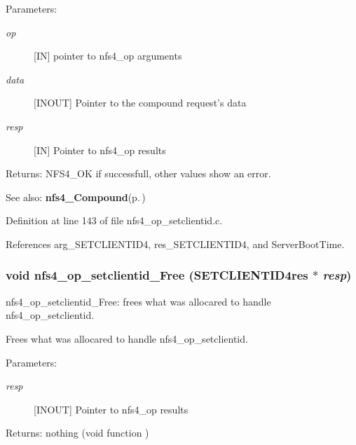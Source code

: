 \begin{Desc}
\item[Parameters:]
\begin{description}
\item[{\em op}][IN] pointer to nfs4\_\-op arguments \item[{\em data}][INOUT] Pointer to the compound request's data \item[{\em resp}][IN] Pointer to nfs4\_\-op results\end{description}
\end{Desc}
\begin{Desc}
\item[Returns:]NFS4\_\-OK if successfull, other values show an error.\end{Desc}
\begin{Desc}
\item[See also:]{\bf nfs4\_\-Compound}{\rm (p.\,\pageref{nfs4__Compound_8c_a4})} \end{Desc}


Definition at line 143 of file nfs4\_\-op\_\-setclientid.c.

References arg\_\-SETCLIENTID4, res\_\-SETCLIENTID4, and Server\-Boot\-Time.
\subsubsection{\setlength{\rightskip}{0pt plus 5cm}void nfs4\_\-op\_\-setclientid\_\-Free (SETCLIENTID4res $\ast$ {\em resp})}\label{nfs4__op__setclientid_8c_a4}


nfs4\_\-op\_\-setclientid\_\-Free: frees what was allocared to handle nfs4\_\-op\_\-setclientid.

Frees what was allocared to handle nfs4\_\-op\_\-setclientid.

\begin{Desc}
\item[Parameters:]
\begin{description}
\item[{\em resp}][INOUT] Pointer to nfs4\_\-op results\end{description}
\end{Desc}
\begin{Desc}
\item[Returns:]nothing (void function ) \end{Desc}


